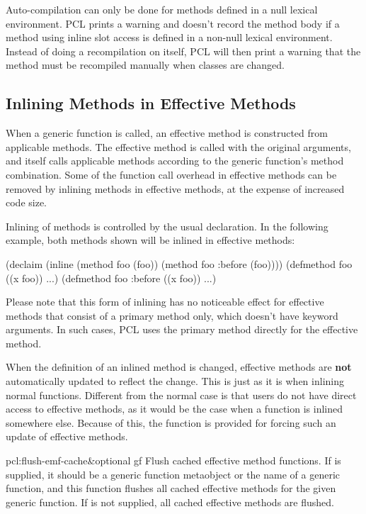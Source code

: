 Auto-compilation can only be done for methods defined in a null
lexical environment.  PCL prints a warning and doesn't record the
method body if a method using inline slot access is defined in a
non-null lexical environment.  Instead of doing a recompilation on
itself, PCL will then print a warning that the method must be
recompiled manually when classes are changed.



\subsection{Inlining Methods in Effective Methods}

When a generic function is called, an effective method is constructed
from applicable methods.  The effective method is called with the
original arguments, and itself calls applicable methods according to
the generic function's method combination.  Some of the function call
overhead in effective methods can be removed by inlining methods in
effective methods, at the expense of increased code size.

Inlining of methods is controlled by the usual 
declaration.  In the following example, both  methods shown
will be inlined in effective methods:

\begin{example}
(declaim (inline (method foo (foo))
                 (method foo :before (foo))))
(defmethod foo ((x foo)) ...)
(defmethod foo :before ((x foo)) ...)
\end{example}

Please note that this form of inlining has no noticeable effect for
effective methods that consist of a primary method only, which doesn't
have keyword arguments.  In such cases, PCL uses the primary method
directly for the effective method.

When the definition of an inlined method is changed, effective methods
are \textbf{not} automatically updated to reflect the change.  This is
just as it is when inlining normal functions.  Different from the
normal case is that users do not have direct access to effective
methods, as it would be the case when a function is inlined somewhere
else.  Because of this, the function  is
provided for forcing such an update of effective methods.

\begin{defun}{pcl:}{flush-emf-cache}{\&optional gf}
  Flush cached effective method functions.  If  is supplied,
  it should be a generic function metaobject or the name of a generic
  function, and this function flushes all cached effective methods for
  the given generic function.  If  is not supplied, all
  cached effective methods are flushed.
\end{defun}

